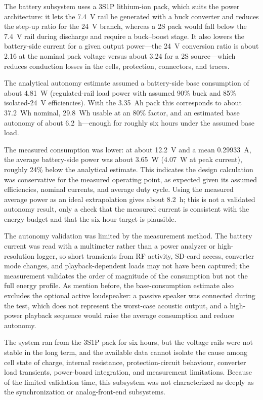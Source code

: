 The battery subsystem uses a 3S1P lithium-ion pack, which suits the power architecture: it lets the 7.4~V rail be generated with a buck converter and reduces the step-up ratio for the 24~V branch, whereas a 2S pack would fall below the 7.4~V rail during discharge and require a buck--boost stage. It also lowers the battery-side current for a given output power---the 24~V conversion ratio is about 2.16 at the nominal pack voltage versus about 3.24 for a 2S source---which reduces conduction losses in the cells, protection, connectors, and traces.

The analytical autonomy estimate assumed a battery-side base consumption of about 4.81~W (regulated-rail load power with assumed 90\% buck and 85\% isolated-24~V efficiencies). With the 3.35~Ah pack this corresponds to about 37.2~Wh nominal, 29.8~Wh usable at an 80\% factor, and an estimated base autonomy of about 6.2~h---enough for roughly six hours under the assumed base load.

The measured consumption was lower: at about 12.2~V and a mean 0.29933~A, the average battery-side power was about 3.65~W (4.07~W at peak current), roughly 24\% below the analytical estimate. This indicates the design calculation was conservative for the measured operating point, as expected given its assumed efficiencies, nominal currents, and average duty cycle. Using the measured average power as an ideal extrapolation gives about 8.2~h; this is not a validated autonomy result, only a check that the measured current is consistent with the energy budget and that the six-hour target is plausible.

The autonomy validation was limited by the measurement method. The battery current was read with a multimeter rather than a power analyzer or high-resolution logger, so short transients from RF activity, SD-card access, converter mode changes, and playback-dependent loads may not have been captured; the measurement validates the order of magnitude of the consumption but not the full energy profile. As mention before, the base-consumption estimate also excludes the optional active loudspeaker: a passive speaker was connected during the test, which does not represent the worst-case acoustic output, and a high-power playback sequence would raise the average consumption and reduce autonomy.

The system ran from the 3S1P pack for six hours, but the voltage rails were not stable in the long term, and the available data cannot isolate the cause among cell state of charge, internal resistance, protection-circuit behaviour, converter load transients, power-board integration, and measurement limitations. Because of the limited validation time, this subsystem was not characterized as deeply as the synchronization or analog-front-end subsystems.

